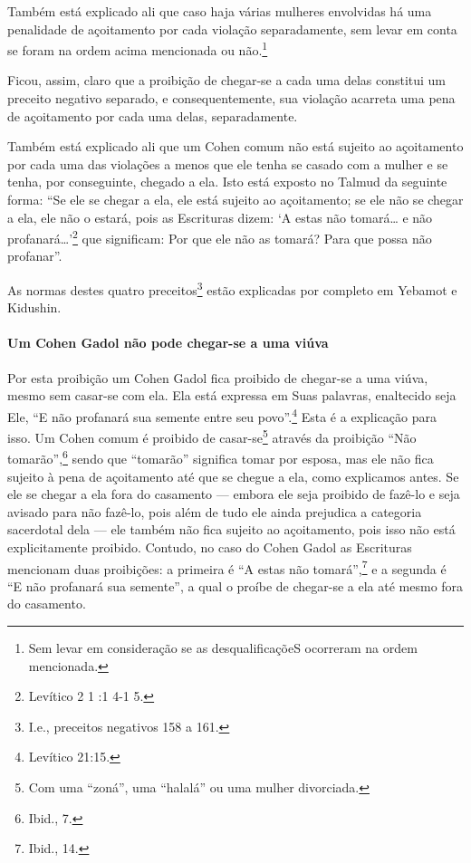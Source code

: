 Também está explicado ali que caso haja várias mulheres envolvidas há
uma penalidade de açoitamento por cada violação separadamente, sem
levar em conta se foram na ordem acima mencionada ou
não.\footnote{Sem levar em consideração se as desqualificaçõeS ocorreram na ordem
mencionada.}

Ficou, assim, claro que a proibição de chegar-se a cada uma delas
constitui um preceito negativo separado, e consequentemente, sua
violação acarreta uma pena de açoitamento por cada uma delas,
separadamente.

Também está explicado ali que um Cohen comum não está sujeito ao
açoitamento por cada uma das violações a menos que ele tenha se casado
com a mulher e se tenha, por conseguinte, chegado a ela. Isto está
exposto no Talmud da seguinte forma: ``Se ele se chegar a ela, ele está
sujeito ao açoitamento; se ele não se chegar a ela, ele não o estará,
pois as Escrituras dizem: `A estas não tomará\ldots{} e não profanará\ldots{}'\footnote{Levítico 2 1 :1 4-1 5.} que significam: Por que ele não as tomará? Para
que possa não profanar''.

As normas destes quatro preceitos\footnote{I.e., preceitos negativos 158 a 161.} estão explicadas
por completo em Yebamot e Kidushin.

\paragraph{Um Cohen Gadol não pode chegar-se a uma viúva}

Por esta proibição um Cohen Gadol fica proibido de chegar-se a uma
viúva, mesmo sem casar-se com ela. Ela está expressa em Suas palavras,
enaltecido seja Ele, ``E não profanará sua semente entre seu povo''.\footnote{Levítico 21:15.} Esta é a explicação para isso. Um Cohen comum é
proibido de casar-se\footnote{Com uma ``zoná'', uma ``halalá'' ou uma mulher divorciada.} através da proibição ``Não
tomarão'',\footnote{Ibid., 7.} sendo que ``tomarão'' significa tomar por esposa,
mas ele não fica sujeito à pena de açoitamento até que se chegue a ela,
como explicamos antes. Se ele se chegar a ela fora do casamento ---
embora ele seja proibido de fazê-lo e seja avisado para não fazê-lo,
pois além de tudo ele ainda prejudica a categoria sacerdotal dela ---
ele também não fica sujeito ao açoitamento, pois isso não está
explicitamente proibido. Contudo, no caso do Cohen Gadol as
Escrituras mencionam duas proibições: a primeira é ``A estas não
tomará'',\footnote{Ibid., 14.} e a segunda é ``E não profanará sua semente'', a
qual o proíbe de chegar-se a ela até mesmo fora do casamento.

